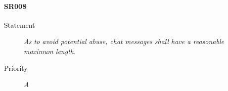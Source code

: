 \paragraph{SR008}
  \begin{description}
  \item [Statement] 
    \textit{ As to avoid potential abuse, chat messages shall have a reasonable maximum length.}
  \item [Priority] \textit{A}
\end{description}
